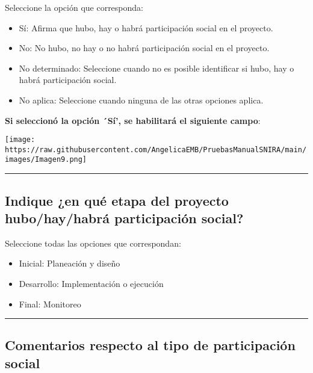 \documentclass[
]{book}
\providecommand{\tightlist}{%
  \setlength{\itemsep}{0pt}\setlength{\parskip}{0pt}}
\begin{document}
Seleccione la opción que corresponda:

\begin{itemize}
\tightlist
\item
  Sí: Afirma que hubo, hay o habrá participación social en el proyecto.
\item
  No: No hubo, no hay o no habrá participación social en el proyecto.
\item
  No determinado: Seleccione cuando no es posible identificar si hubo, hay o habrá participación social.
\item
  No aplica: Seleccione cuando ninguna de las otras opciones aplica.
\end{itemize}

\textbf{Si seleccionó la opción ´Sí', se habilitará el siguiente campo}:

\texttt{[image: https://raw.githubusercontent.com/AngelicaEMB/PruebasManualSNIRA/main/images/Imagen9.png]}

\begin{center}\rule{0.5\linewidth}{0.5pt}\end{center}

\hypertarget{indique-en-quuxe9-etapa-del-proyecto-hubohayhabruxe1-participaciuxf3n-social}{%
\subsection*{Indique ¿en qué etapa del proyecto hubo/hay/habrá participación social?}\label{indique-en-quuxe9-etapa-del-proyecto-hubohayhabruxe1-participaciuxf3n-social}}

Seleccione todas las opciones que correspondan:

\begin{itemize}
\tightlist
\item
  Inicial: Planeación y diseño
\item
  Desarrollo: Implementación o ejecución
\item
  Final: Monitoreo
\end{itemize}

\begin{center}\rule{0.5\linewidth}{0.5pt}\end{center}

\hypertarget{comentarios-respecto-al-tipo-de-participaciuxf3n-social}{%
\subsection*{Comentarios respecto al tipo de participación social}\label{comentarios-respecto-al-tipo-de-participaciuxf3n-social}}
\end{document}
